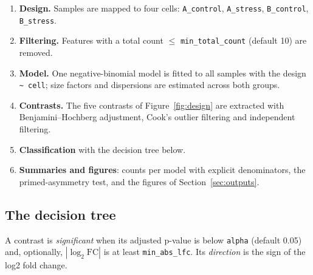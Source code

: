\documentclass[11pt,a4paper]{article}
\newcommand{\code}[1]{\texttt{\color{navy!85!black}#1}}
\begin{document}
\begin{enumerate}
  \item \textbf{Design.} Samples are mapped to four cells: \code{A\_control}, \code{A\_stress},
        \code{B\_control}, \code{B\_stress}.
  \item \textbf{Filtering.} Features with a total count \(\le\) \code{min\_total\_count} (default 10)
        are removed.
  \item \textbf{Model.} One negative-binomial model is fitted to all samples with the design
        \code{\textasciitilde{} cell}; size factors and dispersions are estimated across both groups.
  \item \textbf{Contrasts.} The five contrasts of Figure~\ref{fig:design} are extracted with
        Benjamini--Hochberg adjustment, Cook's outlier filtering and independent filtering.
  \item \textbf{Classification} with the decision tree below.
  \item \textbf{Summaries and figures}: counts per model with explicit denominators, the
        primed-asymmetry test, and the figures of Section~\ref{sec:outputs}.
\end{enumerate}

\subsection{The decision tree}

A contrast is \emph{significant} when its adjusted p-value is below \code{alpha} (default 0.05) and,
optionally, \(|\log_2\mathrm{FC}|\) is at least \code{min\_abs\_lfc}. Its \emph{direction} is the sign of
the log2 fold change.
\end{document}
